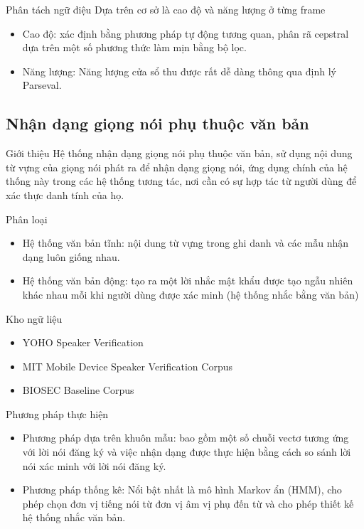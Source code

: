 \documentclass[notheorems, aspectratio=54]{beamer}
\begin{document}
\begin{frame}{Phân tách ngữ điệu}
	Dựa trên cơ sở là cao độ và năng lượng ở từng frame
	\begin{itemize}
		\item Cao độ: xác định bằng phương pháp tự động tương quan, phân rã cepstral dựa trên một số phương thức làm mịn bằng bộ lọc.
		\item Năng lượng: Năng lượng cửa sổ thu được rất dễ dàng thông qua định lý Parseval.
	\end{itemize}
\end{frame}

\subsection{Nhận dạng giọng nói phụ thuộc văn bản}
\begin{frame}{Giới thiệu}
	Hệ thống nhận dạng giọng nói phụ thuộc văn bản, sử dụng nội dung từ vựng của giọng nói phát
	ra để nhận dạng giọng nói, ứng dụng chính của hệ thống này trong các hệ thống tương tác, nơi cần có sự hợp tác từ người dùng để xác thực danh tính của họ.
	
	Phân loại
	\begin{itemize}
		\item Hệ thống văn bản tĩnh: nội dung từ vựng trong ghi danh và các mẫu nhận dạng luôn giống
		nhau.
		\item Hệ thống văn bản động: tạo ra một lời nhắc mật khẩu được tạo ngẫu nhiên khác nhau mỗi
		khi người dùng được xác minh (hệ thống nhắc bằng văn bản)
	\end{itemize}

	Kho ngữ liệu
	\begin{itemize}
		\item YOHO Speaker Verification
		\item MIT Mobile Device Speaker Verification Corpus
		\item BIOSEC Baseline Corpus
	\end{itemize}
\end{frame}
\begin{frame}{Phương pháp thực hiện}
	\begin{itemize}
		\item Phương pháp dựa trên khuôn mẫu: bao gồm một số chuỗi vectơ tương ứng với lời nói đăng
		ký và việc nhận dạng được thực hiện bằng cách so sánh lời nói xác minh với lời nói đăng ký.
		\item Phương pháp thống kê: Nổi bật nhất là mô hình Markov ẩn (HMM), cho phép chọn đơn vị tiếng nói từ đơn vị âm vị phụ đến từ và cho phép thiết kế hệ thống nhắc văn bản.
	\end{itemize}
\end{frame}
\end{document}
